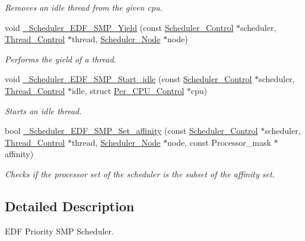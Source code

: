 \begin{DoxyCompactItemize}
\begin{DoxyCompactList}\small\item\em Removes an idle thread from the given cpu. \end{DoxyCompactList}\item 
void \mbox{\hyperlink{group__RTEMSScoreSchedulerSMPEDF_ga11c47d91f890ff36791214d85963174c}{\+\_\+\+Scheduler\+\_\+\+E\+D\+F\+\_\+\+S\+M\+P\+\_\+\+Yield}} (const \mbox{\hyperlink{struct__Scheduler__Control}{Scheduler\+\_\+\+Control}} $\ast$scheduler, \mbox{\hyperlink{struct__Thread__Control}{Thread\+\_\+\+Control}} $\ast$thread, \mbox{\hyperlink{structScheduler__Node}{Scheduler\+\_\+\+Node}} $\ast$node)
\begin{DoxyCompactList}\small\item\em Performs the yield of a thread. \end{DoxyCompactList}\item 
void \mbox{\hyperlink{group__RTEMSScoreSchedulerSMPEDF_ga19604a7710c9cc5f699478cb182bfb64}{\+\_\+\+Scheduler\+\_\+\+E\+D\+F\+\_\+\+S\+M\+P\+\_\+\+Start\+\_\+idle}} (const \mbox{\hyperlink{struct__Scheduler__Control}{Scheduler\+\_\+\+Control}} $\ast$scheduler, \mbox{\hyperlink{struct__Thread__Control}{Thread\+\_\+\+Control}} $\ast$idle, struct \mbox{\hyperlink{structPer__CPU__Control}{Per\+\_\+\+C\+P\+U\+\_\+\+Control}} $\ast$cpu)
\begin{DoxyCompactList}\small\item\em Starts an idle thread. \end{DoxyCompactList}\item 
bool \mbox{\hyperlink{group__RTEMSScoreSchedulerSMPEDF_ga12244678bacb0c36ab3cb6035336503d}{\+\_\+\+Scheduler\+\_\+\+E\+D\+F\+\_\+\+S\+M\+P\+\_\+\+Set\+\_\+affinity}} (const \mbox{\hyperlink{struct__Scheduler__Control}{Scheduler\+\_\+\+Control}} $\ast$scheduler, \mbox{\hyperlink{struct__Thread__Control}{Thread\+\_\+\+Control}} $\ast$thread, \mbox{\hyperlink{structScheduler__Node}{Scheduler\+\_\+\+Node}} $\ast$node, const Processor\+\_\+mask $\ast$affinity)
\begin{DoxyCompactList}\small\item\em Checks if the processor set of the scheduler is the subset of the affinity set. \end{DoxyCompactList}\end{DoxyCompactItemize}


\subsection{Detailed Description}
E\+DF Priority S\+MP Scheduler. 




